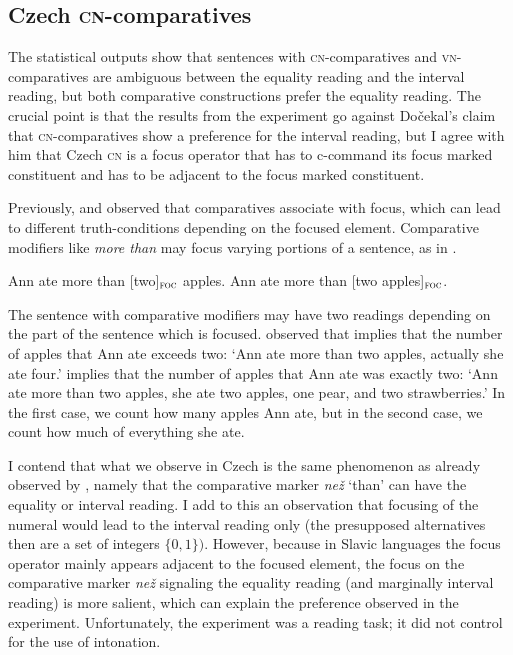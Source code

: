\documentclass[output=paper,
]{langscibook}
\begin{document}
\subsection{Czech \textsc{cn-}comparatives}\label{sect:ccn}

The statistical outputs show that sentences with \textsc{cn-}comparatives and \textsc{vn-}com\-pa\-ra\-tives are ambiguous between the equality reading and the interval reading, but both comparative constructions prefer the equality reading. The crucial point is that the results from the experiment go against Dočekal's claim that \textsc{cn-}comparatives show a preference for the interval reading, but I agree with him that Czech \textsc{cn} is a focus operator that has to c-command its focus marked constituent and has to be adjacent to the focus marked constituent.

Previously, \citet{cohen2014superlative} and \citet{geurts2007least} observed that comparatives associate with focus, which can lead to different truth-conditions depending on the focused element. Comparative modifiers like \textit{more than} may focus varying portions of a sentence, as in .

\ea \label{ex:apples} 
\ea Ann ate more than [two]$_{\textsc{foc}}$ apples. \label{ex:apples_int}
\ex Ann ate more than [two apples]$_{\textsc{foc}}$. \label{ex:apples_exh}
\z
\z

\noindent The sentence with comparative modifiers may have two readings depending on the part of the sentence which is focused. \citet{geurts2007least} observed that  implies that the number of apples that Ann ate exceeds two:  `Ann ate more than two apples, actually she ate four.'  implies that the number of apples that Ann ate was exactly two: `Ann ate more than two apples, she ate two apples, one pear, and two strawberries.' In the first case, we count how many apples Ann ate, but in the second case, we count how much of everything she ate. 

I contend that what we observe in Czech is the same phenomenon as already observed by \cite{dovcekal2017upper}, namely that the comparative marker \textit{než} ‘than’ can have the equality or interval reading. I add to this an observation that focusing of the numeral would lead to the interval reading only (the presupposed alternatives then are a set of integers $\{0,1\})$. However, because in Slavic languages the focus operator mainly appears adjacent to the focused element, the focus on the comparative marker \textit{než} signaling the equality reading (and marginally interval reading) is more salient, which can explain the preference observed in the experiment. Unfortunately, the experiment was a reading task; it did not control for the use of intonation.
\end{document}
